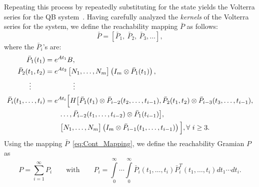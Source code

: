 Repeating this process by repeatedly substituting  for the state yields the Volterra series for the QB system~\cite{sastry2013nonlinear}.  Having carefully  analyzed the \emph{kernels} of the Volterra series for the system, we define the reachability  mapping $\bar{P}$  as follows:
\begin{equation}\label{eq:Cont_Mapping}
 \bar{P} = [\bar P_1,~ \bar P_2,~\bar P_3,\dots],
\end{equation}
where the $\bar P_i$'s are:
\begin{equation}\label{eq:defined_barP}
\begin{aligned}
 \bar P_1(t_1)&= e^{At_1}B,\\
  \bar P_2(t_1,t_2)&= e^{At_2}\begin{bmatrix} N_1,\ldots,N_m\end{bmatrix} \left(I_m\otimes \bar P_1(t_1)\right),\\
    \vdots\qquad&\qquad\qquad\vdots\\
    \bar P_i (t_1,\ldots, t_i)&= e^{At_i}\Big[H \big[\bar P_1(t_1)\otimes \bar P_{i-2}(t_{2},\ldots,t_{i-1}),\bar P_2(t_1,t_2)\otimes \bar P_{i-3}(t_{3},\ldots,t_{i-1}),\\
    &\qquad \ldots, \bar P_{i-2}(t_1,\ldots,t_{i-2})\otimes \bar P_1(t_{i-1})\big],\\
    &  \qquad \begin{bmatrix} N_1,\ldots,N_m\end{bmatrix}\left(I_m\otimes \bar P_{i-1}(t_1,\ldots,t_{i-1})\right)\Big],\forall~i\geq 3.\\
\end{aligned}
\end{equation}
Using the mapping $\bar P$~\eqref{eq:Cont_Mapping}, we  define the reachability Gramian $P$ as
\begin{equation}\label{eq:Cont_Gram}
 P = \sum_{i=1}^{\infty}P_i\qquad \text{with} \qquad P_i = \int\limits_0^{\infty}\cdots \int\limits_0^{\infty} \bar P_i(t_1,\ldots,t_i)\bar P_i^T(t_1,\ldots,t_i)dt_1\cdots dt_i.
\end{equation}

